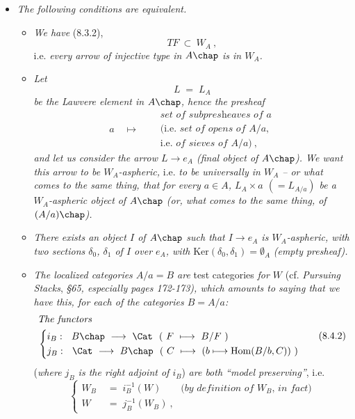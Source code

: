 \begin{itemize}[leftmargin=*]
\item[1$^\circ$)] \textit{The following conditions are equivalent.}
\begin{itemize}[leftmargin=*]
\item[a)] \textit{We have} (8.3.2),
\[
TF\ \subset\ W_A\ ,
\]
i.e. \textit{every arrow of injective type in $A\chap$ is in $W_A$.}
\item[b)] \textit{Let}
\[
L \;=\; L_A
\tag*{(8.4.1)}
\]
\textit{be the Lawvere element in $A\chap$, hence the presheaf}
\[
a \quad\longmapsto\quad
\begin{aligned}
&\textit{set of subpresheaves of $a$}\\
&(\text{i.e. }\textit{set of opens of $A/a$},\\
&\text{i.e. }\textit{of sieves of $A/a$})\ ,
\end{aligned}
\]
\textit{and let us consider the arrow $L\longrightarrow e_A$ (final object of $A\chap$). We want this arrow to be $W_A$-aspheric,} i.e. \textit{to be universally in $W_A$ -- or what comes to the same thing, that for every $a\in A$, $L_A\times a$ $(=L_{A/a})$ be a $W_A$-aspheric object}
\textit{of $A\chap$ (or, what comes to the same thing, of $(A/a)\chap$).}
\item[c)] \textit{There exists an object $I$ of $A\chap$ such that $I\longrightarrow e_A$ is $W_A$-aspheric, with two sections $\delta_0$, $\delta_1$ of $I$ over $e_A$, with} $\mathrm{Ker}(\delta_0,\delta_1)=\emptyset_A$ \textit{(empty presheaf).}
\item[d)] \textit{The localized categories $A/a=B$ are} test categories \textit{for $W$} (cf. \textit{Pursuing Stacks}, \textit{§65, especially pages 172-173), which amounts to saying that we have this, for each of the categories $B=A/a$:}
\[
\begin{aligned}
&\textit{The functors}\\
&\left\{
\begin{aligned}
&i_B:\ \ B\chap \ \longrightarrow\ \Cat\ \ (\ F\ \longmapsto\ B/F\ )\\
&j_B:\ \ \Cat\ \longrightarrow\ B\chap\ \ (\ C\ \longmapsto\ (b\longmapsto \mathrm{Hom}(B/b,C))\ )
\end{aligned}
\right.
\end{aligned}
\tag*{(8.4.2)}
\]
(\textit{where $j_B$ is the right adjoint of $i_B$}) \textit{are both ``model preserving''}, i.e.
\[
\left\{
\begin{aligned}
W_B \;&=\; i_B^{-1}(W) \qquad \textit{(by definition of $W_B$, in fact)}\\
W \;&=\; j_B^{-1}(W_B)\ ,
\end{aligned}
\right.
\tag*{(8.4.3)}
\]
\end{itemize}
\end{itemize}